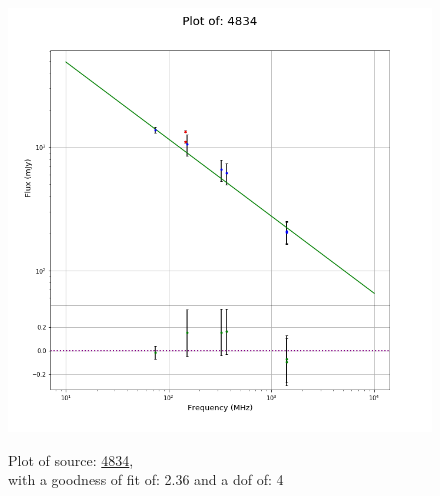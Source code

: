 \documentclass{article}
\begin{document}
\begin{figure}[H]
    \centering
    \begin{minipage}{.5\textwidth}
        \centering
        \includegraphics[scale = 0.35]{KmeulenSimSource_1hr/1hr4834.png}
        \captionsetup{labelformat=empty}
        \caption{Plot of source: \href{http://banana.transientskp.org/r4/vlo_KmeulenSimSource/runningcatalog/4834}{4834},\\with a goodness of fit of: 2.36 and a dof of: 4}
        \addtocounter{figure}{-1}
        \label{KmeulenSimSource:1hr:4834:plot}
    \end{minipage}%
    \begin{minipage}{0.5\textwidth}
        \centering


\end{minipage}
\end{figure}
\end{document}
